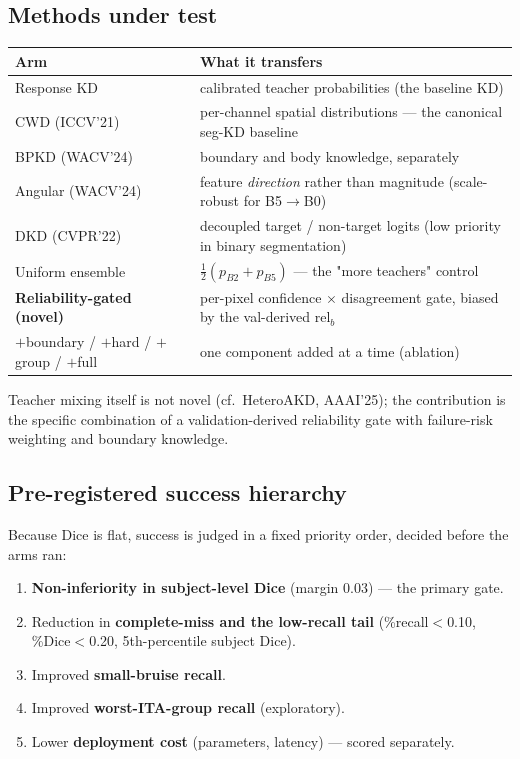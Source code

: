 \documentclass[11pt]{article}
\begin{document}
\subsection{Methods under test}

\begin{center}\small
\begin{tabular}{>{\raggedright\arraybackslash}p{4.6cm} >{\raggedright\arraybackslash}p{9.8cm}}
\toprule
\textbf{Arm} & \textbf{What it transfers} \\
\midrule
Response KD & calibrated teacher probabilities (the baseline KD) \\
CWD (ICCV'21) & per-channel spatial distributions --- the canonical seg-KD baseline \\
BPKD (WACV'24) & boundary and body knowledge, separately \\
Angular (WACV'24) & feature \emph{direction} rather than magnitude (scale-robust for B5$\to$B0) \\
DKD (CVPR'22) & decoupled target / non-target logits (low priority in binary segmentation) \\
Uniform ensemble & $\tfrac12(p_{B2}+p_{B5})$ --- the "more teachers" control \\
\textbf{Reliability-gated (novel)} & per-pixel confidence $\times$ disagreement gate, biased by the
val-derived $\mathrm{rel}_b$ \\
\quad $+$boundary / $+$hard / $+$group / $+$full & one component added at a time (ablation) \\
\bottomrule
\end{tabular}
\end{center}

Teacher mixing itself is not novel (cf.\ HeteroAKD, AAAI'25); the contribution is the specific
combination of a validation-derived reliability gate with failure-risk weighting and boundary
knowledge.

\subsection{Pre-registered success hierarchy}

Because Dice is flat, success is judged in a fixed priority order, decided before the arms ran:

\begin{enumerate}[leftmargin=1.8em,itemsep=1pt]
  \item \textbf{Non-inferiority in subject-level Dice} (margin $0.03$) --- the primary gate.
  \item Reduction in \textbf{complete-miss and the low-recall tail} (\%recall$<$0.10,
        \%Dice$<$0.20, 5th-percentile subject Dice).
  \item Improved \textbf{small-bruise recall}.
  \item Improved \textbf{worst-ITA-group recall} (exploratory).
  \item Lower \textbf{deployment cost} (parameters, latency) --- scored separately.
\end{enumerate}
\end{document}
